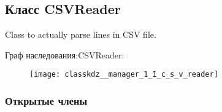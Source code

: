 \subsection{Класс C\+S\+V\+Reader}
\label{classkdz__manager_1_1_c_s_v_reader}


Class to actually parse lines in C\+S\+V file.  


Граф наследования\+:C\+S\+V\+Reader\+:\begin{figure}[H]
\begin{center}
\leavevmode
\texttt{[image: classkdz\_\_manager\_1\_1\_c\_s\_v\_reader]}
\end{center}
\end{figure}
\subsubsection*{Открытые члены}
